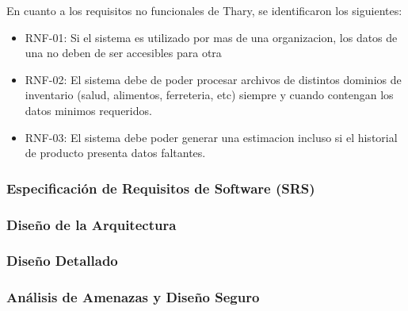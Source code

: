 En cuanto a los requisitos no funcionales de Thary, se identificaron los siguientes:

\begin{itemize}
    \item RNF-01: Si el sistema es utilizado por mas de una organizacion, los datos de una no deben de ser accesibles para otra
    \item RNF-02: El sistema debe de poder procesar archivos de distintos dominios de inventario (salud, alimentos, ferreteria, etc) siempre y cuando contengan los datos minimos requeridos.
    \item RNF-03: El sistema debe poder generar una estimacion incluso si el historial de producto presenta datos faltantes.
\end{itemize}

\subsubsection{Especificación de Requisitos de Software (SRS)}


\subsubsection{Diseño de la Arquitectura}


\subsubsection{Diseño Detallado}


\subsubsection{Análisis de Amenazas y Diseño Seguro}

